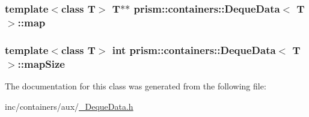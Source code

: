 \subsubsection[{\texorpdfstring{map}{map}}]{\setlength{\rightskip}{0pt plus 5cm}template$<$class T$>$ T$\ast$$\ast$ {\bf prism\+::containers\+::\+Deque\+Data}$<$ T $>$\+::map}\hypertarget{classprism_1_1containers_1_1_deque_data_a1760fab65f72a59bf121f84042409462}{}\label{classprism_1_1containers_1_1_deque_data_a1760fab65f72a59bf121f84042409462}
\subsubsection[{\texorpdfstring{map\+Size}{mapSize}}]{\setlength{\rightskip}{0pt plus 5cm}template$<$class T$>$ int {\bf prism\+::containers\+::\+Deque\+Data}$<$ T $>$\+::map\+Size}\hypertarget{classprism_1_1containers_1_1_deque_data_a0fff90781042b14137e69017dc0d6479}{}\label{classprism_1_1containers_1_1_deque_data_a0fff90781042b14137e69017dc0d6479}


The documentation for this class was generated from the following file\+:\begin{DoxyCompactItemize}
\item 
inc/containers/aux/\hyperlink{___deque_data_8h}{\+\_\+\+Deque\+Data.\+h}\end{DoxyCompactItemize}
